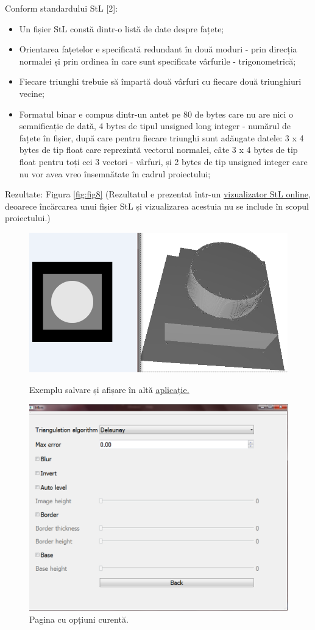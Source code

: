 \documentclass[12pt]{article}
\begin{document}
Conform standardului StL [2]:
\begin{itemize}
	\item Un fișier StL constă dintr-o listă de date despre fațete;
	\item Orientarea fațetelor e specificată redundant în două moduri - prin direcția normalei și prin ordinea în care sunt specificate vârfurile - trigonometrică;
	\item Fiecare triunghi trebuie să împartă două vârfuri cu fiecare două triunghiuri vecine;
	\item Formatul binar e compus dintr-un antet pe 80 de bytes care nu are nici o semnificație de dată, 4 bytes de tipul unsigned long integer - numărul de fațete în fișier, după care pentru fiecare triunghi sunt adăugate datele: 3 x 4 bytes de tip float care reprezintă vectorul normalei, câte 3 x 4 bytes de tip float pentru toți cei 3 vectori - vârfuri, și 2 bytes de tip unsigned integer care nu vor avea vreo însemnătate în cadrul proiectului;
\end{itemize}

Rezultate: Figura \ref{fig:fig8} (Rezultatul e prezentat într-un \href{https://www.viewstl.com/}{vizualizator StL online}, deoarece încărcarea unui fișier StL și vizualizarea acestuia nu se include în scopul proiectului.)

\begin{figure}[!htb]
	\begin{minipage}{0.48\textwidth}
		\centering
		\includegraphics[width=.7\linewidth]{ExempluSalvare.png}
		\caption{Exemplu salvare și afișare în altă \href{https://www.viewstl.com/}{aplicație.}}\label{fig:fig8}
	\end{minipage}
	\begin{minipage}{0.48\textwidth}
		\centering
		\includegraphics[width=.7\linewidth]{DouaPaginaInterfata.png}
		\caption{Pagina cu opțiuni curentă.}\label{fig:fig9}
	\end{minipage}\hfill
\end{figure}
\end{document}

